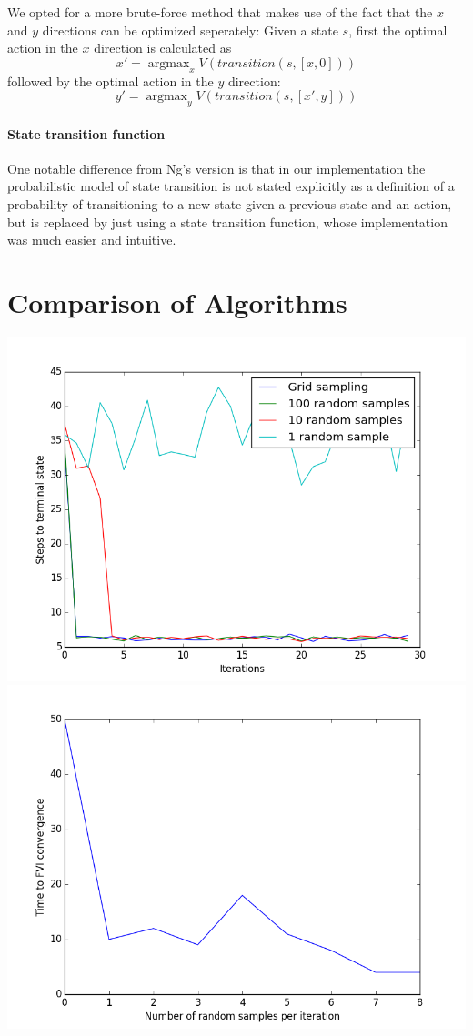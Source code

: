 \documentclass[a4paper, 12pt]{article}
\DeclareMathOperator*{\argmax}{argmax}
\begin{document}
We opted for a more brute-force method that makes use of the fact that
the $x$ and $y$ directions can be optimized seperately: Given a state $s$, first
the optimal action in the $x$ direction is calculated as
\[
  x' = \argmax_x V(transition(s, [x, 0]))
\]
followed by the optimal action in the $y$ direction:
\[
  y' = \argmax_y V(transition(s, [x', y]))
\]

\paragraph{State transition function}
One notable difference from Ng's version is that in our implementation
the probabilistic model of state transition is not stated explicitly
as a definition of a probability of transitioning to a new state 
given a previous state and an action, but is replaced by
just using a state transition function, whose implementation
was much easier and intuitive.

\section*{Comparison of Algorithms}
\includegraphics[scale=0.7]{convergence.png}
\includegraphics[scale=0.7]{n_samples.png}
\end{document}
